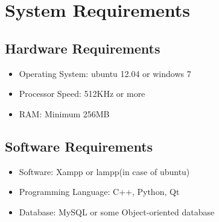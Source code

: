 \section{System Requirements}
\subsection{Hardware Requirements}
\begin{itemize}
\item Operating System: ubuntu 12.04 or windows 7
\item Processor Speed: 512KHz or more
\item RAM: Minimum 256MB
\end{itemize}
\subsection{Software Requirements}
\begin{itemize}
\item Software: Xampp or lampp(in case of ubuntu)
\item Programming Language: C++, Python, Qt
\item Database: MySQL or some Object-oriented database
\end{itemize}
